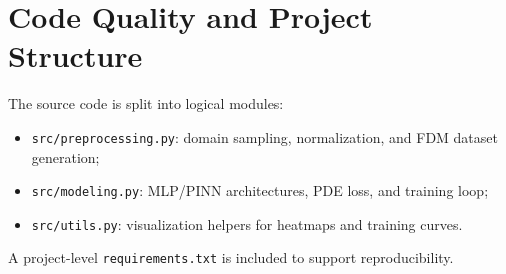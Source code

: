 \documentclass[conference]{IEEEtran}
\begin{document}
\section{Code Quality and Project Structure}
The source code is split into logical modules:
\begin{itemize}
    \item \texttt{src/preprocessing.py}: domain sampling, normalization, and FDM dataset generation;
    \item \texttt{src/modeling.py}: MLP/PINN architectures, PDE loss, and training loop;
    \item \texttt{src/utils.py}: visualization helpers for heatmaps and training curves.
\end{itemize}
A project-level \texttt{requirements.txt} is included to support reproducibility.
\end{document}
